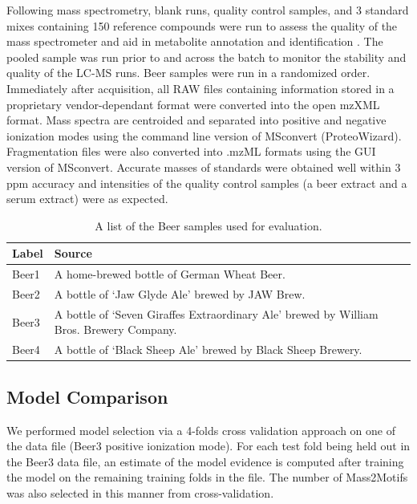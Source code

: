 Following mass spectrometry, blank runs, quality control samples, and 3 standard mixes containing 150 reference compounds were run to assess the quality of the mass spectrometer and aid in metabolite annotation and identification \cite{Creek2011}. The pooled sample was run prior to and across the batch to monitor the stability and quality of the LC-MS runs. Beer samples were run in a randomized order. Immediately after acquisition, all RAW files containing information stored in a proprietary vendor-dependant format were converted into the open mzXML format. Mass spectra are centroided and separated into positive and negative ionization modes using the command line version of MSconvert (ProteoWizard). Fragmentation files were also converted into .mzML formats using the GUI version of MSconvert.  Accurate masses of standards were obtained well within 3 ppm accuracy and intensities of the quality control samples (a beer extract and a serum extract) were as expected. 

\begin{table}[!htbp]
\small
\centering
\begin{tabular}{|l|l|}
\hline
\textbf{Label} & \textbf{Source}                                                                                                                                                                                        \\ \hline
Beer1          & A home-brewed bottle of German Wheat Beer. \\ \hline
Beer2          & A bottle of `Jaw Glyde Ale’ brewed by JAW Brew. \\ \hline
Beer3          & A bottle of `Seven Giraffes Extraordinary Ale’ brewed by William Bros. Brewery Company. \\ \hline
Beer4          & A bottle of `Black Sheep Ale’ brewed by Black Sheep Brewery. \\ \hline
\end{tabular}
\caption{A list of the Beer samples used for evaluation.}
\label{tab:beer-sample-details}
\end{table}

\subsection{Model Comparison}

We performed model selection via a 4-folds cross validation approach on one of the data file (Beer3 positive ionization mode). For each test fold being held out in the Beer3 data file, an estimate of the model evidence is computed after training the model on the remaining training folds in the file. The number of Mass2Motifs was also selected in this manner from cross-validation. 

